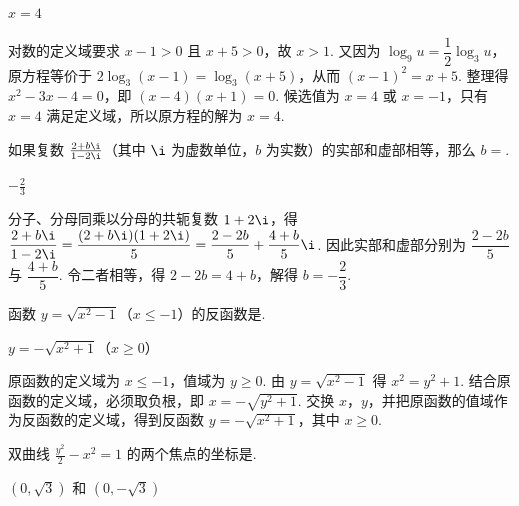 \begin{answer}
\(x = 4\)
\end{answer}

\begin{solution}
对数的定义域要求 \(x-1>0\) 且 \(x+5>0\)，故 \(x>1\). 又因为 \(\log_9 u=\dfrac{1}{2}\log_3u\)，原方程等价于
\(2\log_3(x-1)=\log_3(x+5)\)，从而 \((x-1)^2=x+5\). 整理得 \(x^2-3x-4=0\)，即 \((x-4)(x+1)=0\). 候选值为 \(x=4\) 或 \(x=-1\)，只有 \(x=4\) 满足定义域，所以原方程的解为 \(x=4\).
\end{solution}

\begin{problem}
如果复数 \(\frac{2 + b\i}{1 - 2\i}\)（其中 \(\i\) 为虚数单位，\(b\) 为实数）的实部和虚部相等，那么 \(b =\)\fillinblank{}.
\end{problem}

\begin{answer}
\(-\frac{2}{3}\)
\end{answer}

\begin{solution}
分子、分母同乘以分母的共轭复数 \(1+2\i\)，得
\(\dfrac{2+b\i}{1-2\i}=\dfrac{(2+b\i)(1+2\i)}{5}=\dfrac{2-2b}{5}+\dfrac{4+b}{5}\i\). 因此实部和虚部分别为 \(\dfrac{2-2b}{5}\) 与 \(\dfrac{4+b}{5}\). 令二者相等，得 \(2-2b=4+b\)，解得 \(b=-\dfrac{2}{3}\).
\end{solution}

\begin{problem}
函数 \(y = \sqrt{x^2 - 1}\)（\(x \leqslant -1\)）的反函数是\fillinblank{}.
\end{problem}

\begin{answer}
\(y = -\sqrt{x^2 + 1}\)（\(x \geqslant 0\)）
\end{answer}

\begin{solution}
原函数的定义域为 \(x\leqslant-1\)，值域为 \(y\geqslant0\). 由 \(y=\sqrt{x^2-1}\) 得 \(x^2=y^2+1\). 结合原函数的定义域，必须取负根，即 \(x=-\sqrt{y^2+1}\). 交换 \(x\)，\(y\)，并把原函数的值域作为反函数的定义域，得到反函数
\(y=-\sqrt{x^2+1}\)，其中 \(x\geqslant0\).
\end{solution}

\begin{problem}
双曲线 \(\frac{y^2}{2} - x^2 = 1\) 的两个焦点的坐标是\fillinblank{}.
\end{problem}

\begin{answer}
\((0, \sqrt{3})\) 和 \((0, -\sqrt{3})\)
\end{answer}


